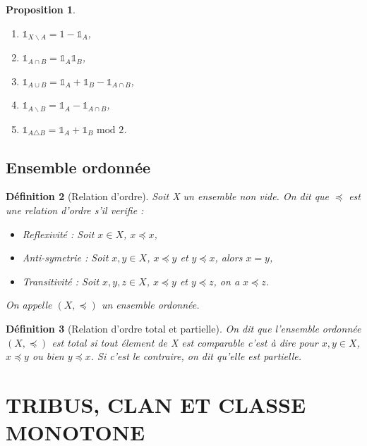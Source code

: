 \documentclass[a4paper,12pt,french]{report}
\theoremstyle{break}
\newtheorem{defin}{Définition}[section]
\newtheorem{prop}[defin]{Proposition}
\begin{document}
\begin{prop}
       \begin{enumerate}
              \item $\mathds{1}_{X\backslash A} = 1 - \mathds{1}_{A}$,
              \item $\mathds{1}_{A \cap B} = \mathds{1}_{A} \mathds{1}_{B}$,
              \item $\mathds{1}_{A \cup B} = \mathds{1}_{A} + \mathds{1}_{B} - \mathds{1}_{A \cap B}$,
              \item $\mathds{1}_{A \backslash B} = \mathds{1}_{A} - \mathds{1}_{A \cap B}$,
              \item $\mathds{1}_{A \triangle B} = \mathds{1}_{A} + \mathds{1}_{B} \mbox{ mod } 2$.
       \end{enumerate}
\end{prop}

\section{Ensemble ordonnée}
\begin{defin}[Relation d'ordre]
       Soit X un ensemble non vide. On dit que  $\preccurlyeq$ est une relation d'ordre s'il verifie :
       \begin{itemize}
              \item[i)] Reflexivité : Soit $x \in X$, $x \preccurlyeq x$,
              \item[ii)] Anti-symetrie : Soit $x, y \in X$, $x \preccurlyeq y$ et $y \preccurlyeq x$, alors $x=y$,
              \item[iii)] Transitivité : Soit $x, y, z \in X$, $x \preccurlyeq y$ et $y \preccurlyeq z$, on a $x \preccurlyeq z$.   
       \end{itemize}
       On appelle $(X, \preccurlyeq)$ un ensemble ordonnée.
\end{defin}

\begin{defin}[Relation d'ordre total et partielle]
       On dit que l'ensemble ordonnée $(X, \preccurlyeq)$ est total si tout élement de X est comparable c'est à dire pour $x, y \in X$, $x \preccurlyeq y$ ou bien $y \preccurlyeq x$.
       Si c'est le contraire, on dit qu'elle est partielle.
\end{defin}


\chapter{TRIBUS, CLAN ET CLASSE MONOTONE}
\end{document}
